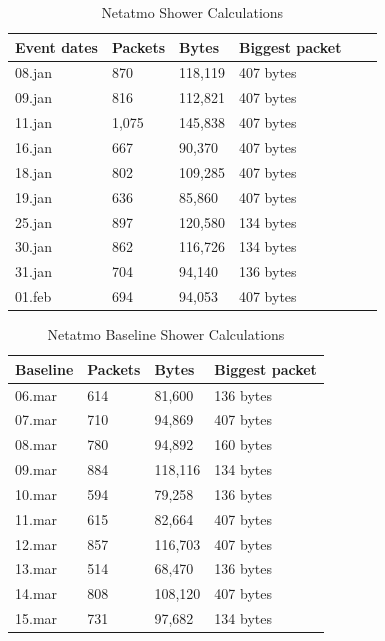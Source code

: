 \begin{table}[H]
    \centering
    \caption{Netatmo Shower Calculations}
    \begin{tabular}{|l|l|l|l|l|l|}
    \hline
        \textbf{Event dates} & \textbf{Packets} & \textbf{Bytes} & \textbf{Biggest packet} \\ \hline
        08.jan & 870   & 118,119 & 407 bytes\\ \hline
        09.jan & 816   & 112,821 & 407 bytes \\ \hline
        11.jan & 1,075 & 145,838 & 407 bytes\\ \hline
        16.jan & 667   & 90,370  & 407 bytes\\ \hline
        18.jan & 802   & 109,285 & 407 bytes\\ \hline
        19.jan & 636   & 85,860  & 407 bytes \\ \hline
        25.jan & 897   & 120,580 & 134 bytes \\ \hline
        30.jan & 862   & 116,726 & 134 bytes \\ \hline
        31.jan & 704   & 94,140  & 136 bytes \\ \hline
        01.feb & 694   & 94,053  & 407 bytes \\ \hline
    \end{tabular}
    \label{tab:NetatmoShowerCalculations}
\end{table}

\begin{table}[H]
    \centering
    \caption{Netatmo Baseline Shower Calculations}
    \begin{tabular}{|l|l|l|l|}
    \hline
        \textbf{Baseline} & \textbf{Packets} & \textbf{Bytes} & \textbf{Biggest packet} \\ \hline
        06.mar & 614 & 81,600  & 136 bytes\\ \hline
        07.mar & 710 & 94,869  & 407 bytes\\ \hline
        08.mar & 780 & 94,892  & 160 bytes \\ \hline
        09.mar & 884 & 118,116 & 134 bytes \\ \hline
        10.mar & 594 & 79,258  & 136 bytes \\ \hline
        11.mar & 615 & 82,664  & 407 bytes \\ \hline
        12.mar & 857 & 116,703 & 407 bytes \\ \hline
        13.mar & 514 & 68,470  & 136 bytes \\ \hline
        14.mar & 808 & 108,120 & 407 bytes \\ \hline
        15.mar & 731 & 97,682  & 134 bytes \\ \hline
    \end{tabular}
    \label{tab:NetatmoBaselineShowerCalculations}
\end{table}


